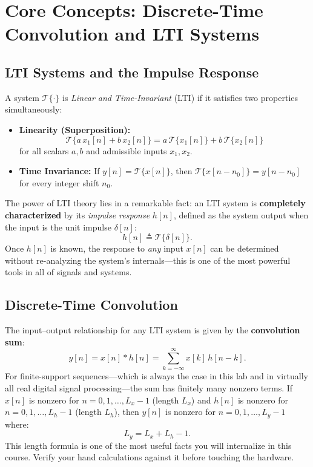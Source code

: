 \documentclass[11pt,letterpaper]{article}
\begin{document}
\section{Core Concepts: Discrete-Time Convolution and LTI Systems}

\subsection{LTI Systems and the Impulse Response}

A system $\mathcal{T}\{\cdot\}$ is \emph{Linear and Time-Invariant} (LTI) if it satisfies two properties simultaneously:
\begin{itemize}
    \item \textbf{Linearity (Superposition):}
    \[
        \mathcal{T}\{a\,x_1[n] + b\,x_2[n]\} = a\,\mathcal{T}\{x_1[n]\} + b\,\mathcal{T}\{x_2[n]\}
    \]
    for all scalars $a, b$ and admissible inputs $x_1, x_2$.
    \item \textbf{Time Invariance:} If $y[n] = \mathcal{T}\{x[n]\}$, then $\mathcal{T}\{x[n - n_0]\} = y[n - n_0]$ for every integer shift $n_0$.
\end{itemize}

The power of LTI theory lies in a remarkable fact: an LTI system is \textbf{completely characterized} by its \emph{impulse response} $h[n]$, defined as the system output when the input is the unit impulse $\delta[n]$:
\[
    h[n] \triangleq \mathcal{T}\{\delta[n]\}.
\]
Once $h[n]$ is known, the response to \emph{any} input $x[n]$ can be determined without re-analyzing the system's internals---this is one of the most powerful tools in all of signals and systems.

\subsection{Discrete-Time Convolution}

The input--output relationship for any LTI system is given by the \textbf{convolution sum}:
\begin{equation}
    y[n] = x[n] * h[n] = \sum_{k=-\infty}^{\infty} x[k]\, h[n - k].
    \label{eq:conv}
\end{equation}
For finite-support sequences---which is always the case in this lab and in virtually all real digital signal processing---the sum has finitely many nonzero terms. If $x[n]$ is nonzero for $n = 0, 1, \ldots, L_x - 1$ (length $L_x$) and $h[n]$ is nonzero for $n = 0, 1, \ldots, L_h - 1$ (length $L_h$), then $y[n]$ is nonzero for $n = 0, 1, \ldots, L_y - 1$ where:
\begin{equation}
    L_y = L_x + L_h - 1.
    \label{eq:output_length}
\end{equation}
This length formula is one of the most useful facts you will internalize in this course. Verify your hand calculations against it before touching the hardware.
\end{document}
